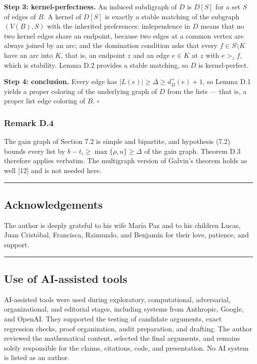 \documentclass[
  11pt,
]{article}
\begin{document}
\textbf{Step 3: kernel-perfectness.} An induced subdigraph of \(D\) is
\(D[S]\) for a set \(S\) of edges of \(B\). A kernel of \(D[S]\) is
exactly a stable matching of the subgraph \((V(B),S)\) with the
inherited preferences: independence in \(D\) means that no two kernel
edges share an endpoint, because two edges at a common vertex are always
joined by an arc; and the domination condition asks that every
\(f\in S\setminus K\) have an arc into \(K\), that is, an endpoint \(z\)
and an edge \(e\in K\) at \(z\) with \(e>_zf\), which is stability.
Lemma D.2 provides a stable matching, so \(D\) is kernel-perfect.

\textbf{Step 4: conclusion.} Every edge has
\(|L(e)|\ge\Delta\ge d^+_D(e)+1\), so Lemma D.1 yields a proper coloring
of the underlying graph of \(D\) from the lists --- that is, a proper
list edge coloring of \(B\). \(\square\)

\subsubsection{Remark D.4}\label{remark-d.4-application}

The gain graph of Section 7.2 is simple and bipartite, and hypothesis
(7.2) bounds every list by \(b-t_i\ge\max\{\rho,u\}\ge\Delta\) of the
gain graph. Theorem D.3 therefore applies verbatim. The multigraph
version of Galvin's theorem holds as well {[}12{]} and is not needed
here.

\begin{center}\rule{0.5\linewidth}{0.5pt}\end{center}

\subsection{Acknowledgements}\label{acknowledgements}

The author is deeply grateful to his wife María Paz and to his children
Lucas, Juan Cristóbal, Francisca, Raimundo, and Benjamín for their love,
patience, and support.

\begin{center}\rule{0.5\linewidth}{0.5pt}\end{center}

\subsection{Use of AI-assisted tools}\label{use-of-ai-assisted-tools}

AI-assisted tools were used during exploratory, computational,
adversarial, organizational, and editorial stages, including systems
from Anthropic, Google, and OpenAI. They supported the testing of
candidate arguments, exact regression checks, proof organization, audit
preparation, and drafting. The author reviewed the mathematical content,
selected the final arguments, and remains solely responsible for the
claims, citations, code, and presentation. No AI system is listed as an
author.
\end{document}
